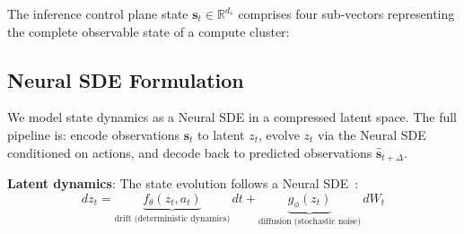 \documentclass[conference,10pt]{IEEEtran}
\begin{document}
The inference control plane state $\mathbf{s}_t \in \mathbb{R}^{d_s}$ comprises four sub-vectors representing the complete observable state of a compute cluster:

\begin{table}[!htbp]
\caption{World Model State Space Components ($d_s = 176$)}
\label{tab:state}
\centering\scriptsize
{}
\end{table}

\subsection{Neural SDE Formulation}

We model state dynamics as a Neural SDE in a compressed latent space. The full pipeline is: encode observations $\mathbf{s}_t$ to latent $z_t$, evolve $z_t$ via the Neural SDE conditioned on actions, and decode back to predicted observations $\hat{\mathbf{s}}_{t+\Delta}$.

\textbf{Latent dynamics}: The state evolution follows a Neural SDE~\cite{li2020scalable}:
\begin{equation}
dz_t = \underbrace{f_\theta(z_t, a_t)}_{\text{drift (deterministic dynamics)}}\,dt + \underbrace{g_\phi(z_t)}_{\text{diffusion (stochastic noise)}}\,dW_t
\label{eq:sde}
\end{equation}
\end{document}
